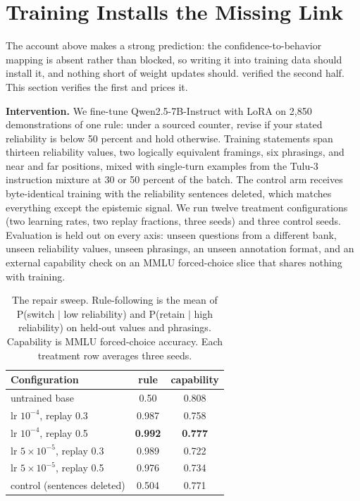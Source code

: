 \documentclass{article}
\begin{document}
\section{Training Installs the Missing Link}
\label{sec:repair}

The account above makes a strong prediction: the confidence-to-behavior mapping is absent rather than blocked, so writing it into training data should install it, and nothing short of weight updates should.  verified the second half. This section verifies the first and prices it.

\textbf{Intervention.} We fine-tune Qwen2.5-7B-Instruct with LoRA \citep{hu2022lora} on 2{,}850 demonstrations of one rule: under a sourced counter, revise if your stated reliability is below 50 percent and hold otherwise. Training statements span thirteen reliability values, two logically equivalent framings, six phrasings, and near and far positions, mixed with single-turn examples from the Tulu-3 instruction mixture at 30 or 50 percent of the batch. The control arm receives byte-identical training with the reliability sentences deleted, which matches everything except the epistemic signal. We run twelve treatment configurations (two learning rates, two replay fractions, three seeds) and three control seeds. Evaluation is held out on every axis: unseen questions from a different bank, unseen reliability values, unseen phrasings, an unseen annotation format, and an external capability check on an MMLU forced-choice slice that shares nothing with training.

\begin{table}[t]
\caption{The repair sweep. Rule-following is the mean of P(switch $\mid$ low reliability) and P(retain $\mid$ high reliability) on held-out values and phrasings. Capability is MMLU forced-choice accuracy. Each treatment row averages three seeds.}
\label{tab:repair}
\vskip 0.1in
\centering
\small
\begin{tabular}{lcc}
\toprule
Configuration & rule & capability \\
\midrule
untrained base & 0.50 & 0.808 \\
lr $10^{-4}$, replay 0.3 & 0.987 & 0.758 \\
lr $10^{-4}$, replay 0.5 & \textbf{0.992} & \textbf{0.777} \\
lr $5\times10^{-5}$, replay 0.3 & 0.989 & 0.722 \\
lr $5\times10^{-5}$, replay 0.5 & 0.976 & 0.734 \\
control (sentences deleted) & 0.504 & 0.771 \\
\bottomrule
\end{tabular}
\vskip -0.1in
\end{table}
\end{document}
